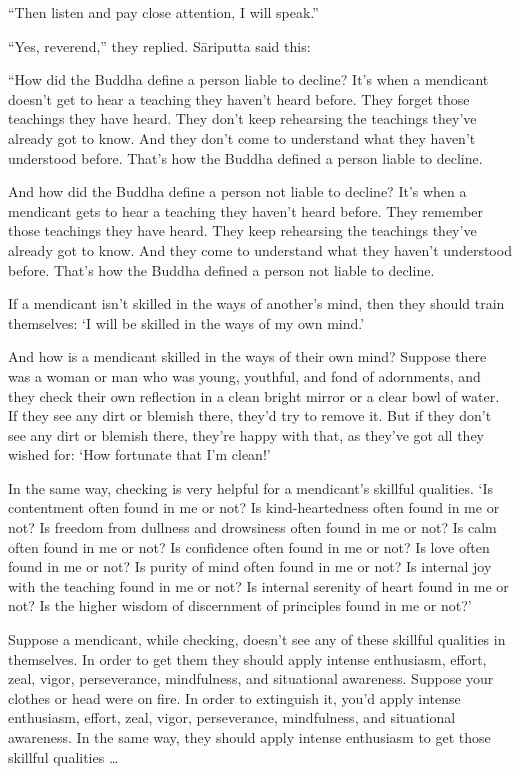 \documentclass[12pt,openany]{book}%
\begin{document}
“Then listen and pay close attention, I will speak.” 

“Yes, reverend,” they replied. \textsanskrit{Sāriputta} said this: 

“How did the Buddha define a person liable to decline? It’s when a mendicant doesn’t get to hear a teaching they haven’t heard before. They forget those teachings they have heard. They don’t keep rehearsing the teachings they’ve already got to know. And they don’t come to understand what they haven’t understood before. That’s how the Buddha defined a person liable to decline. 

And how did the Buddha define a person not liable to decline? It’s when a mendicant gets to hear a teaching they haven’t heard before. They remember those teachings they have heard. They keep rehearsing the teachings they’ve already got to know. And they come to understand what they haven’t understood before. That’s how the Buddha defined a person not liable to decline. 

If a mendicant isn’t skilled in the ways of another’s mind, then they should train themselves: ‘I will be skilled in the ways of my own mind.’ 

And how is a mendicant skilled in the ways of their own mind? Suppose there was a woman or man who was young, youthful, and fond of adornments, and they check their own reflection in a clean bright mirror or a clear bowl of water. If they see any dirt or blemish there, they’d try to remove it. But if they don’t see any dirt or blemish there, they’re happy with that, as they’ve got all they wished for: ‘How fortunate that I’m clean!’ 

In the same way, checking is very helpful for a mendicant’s skillful qualities. ‘Is contentment often found in me or not? Is kind-heartedness often found in me or not? Is freedom from dullness and drowsiness often found in me or not? Is calm often found in me or not? Is confidence often found in me or not? Is love often found in me or not? Is purity of mind often found in me or not? Is internal joy with the teaching found in me or not? Is internal serenity of heart found in me or not? Is the higher wisdom of discernment of principles found in me or not?’ 

Suppose a mendicant, while checking, doesn’t see any of these skillful qualities in themselves. In order to get them they should apply intense enthusiasm, effort, zeal, vigor, perseverance, mindfulness, and situational awareness. Suppose your clothes or head were on fire. In order to extinguish it, you’d apply intense enthusiasm, effort, zeal, vigor, perseverance, mindfulness, and situational awareness. In the same way, they should apply intense enthusiasm to get those skillful qualities … 
\end{document}

